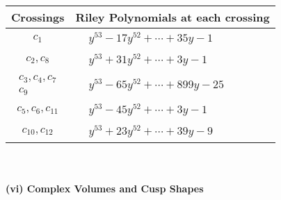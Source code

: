 \documentclass[1p]{elsarticle_modified}
\theoremstyle{definition}
\begin{document}
\begin{tabular}{m{50pt}|m{274pt}}
Crossings & \hspace{64pt}Riley Polynomials at each crossing \\
\hline $$\begin{aligned}c_{1}\end{aligned}$$&$\begin{aligned}
&y^{53}-17 y^{52}+\cdots+35 y-1
\end{aligned}$\\
\hline $$\begin{aligned}c_{2},c_{8}\end{aligned}$$&$\begin{aligned}
&y^{53}+31 y^{52}+\cdots+3 y-1
\end{aligned}$\\
\hline $$\begin{aligned}c_{3},c_{4},c_{7}\\c_{9}\end{aligned}$$&$\begin{aligned}
&y^{53}-65 y^{52}+\cdots+899 y-25
\end{aligned}$\\
\hline $$\begin{aligned}c_{5},c_{6},c_{11}\end{aligned}$$&$\begin{aligned}
&y^{53}-45 y^{52}+\cdots+3 y-1
\end{aligned}$\\
\hline $$\begin{aligned}c_{10},c_{12}\end{aligned}$$&$\begin{aligned}
&y^{53}+23 y^{52}+\cdots+39 y-9
\end{aligned}$\\
\hline
\end{tabular}\\~\\
\newpage\flushleft \textbf{(vi) Complex Volumes and Cusp Shapes}
\end{document}
